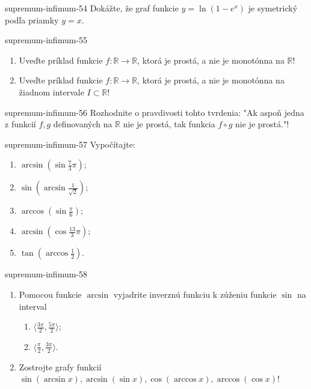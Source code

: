 \begin{defproblem}{supremum-infimum-54}
Dokážte, že graf funkcie $y=\ln (1-e^x)$ je symetrický podľa priamky $y=x$.
\end{defproblem}

\begin{defproblem}{supremum-infimum-55}
\begin{enumerate}
\item Uveďte príklad funkcie $f:\mathbb{R}\rightarrow\mathbb{R}$, ktorá je prostá, a nie je monotónna na $\mathbb{R}$!
\item Uveďte príklad funkcie $f:\mathbb{R}\rightarrow\mathbb{R}$, ktorá je prostá, a nie je monotónna na žiadnom intervale $I\subset\mathbb{R}$!
\end{enumerate}
\end{defproblem}

\begin{defproblem}{supremum-infimum-56}
Rozhodnite o pravdivosti tohto tvrdenia: "Ak aspoň jedna z funkcií $f,g$ definovaných na $\mathbb{R}$ nie je prostá, tak funkcia $f\circ g$ nie je prostá."!
\end{defproblem}

\begin{defproblem}{supremum-infimum-57}
Vypočítajte:
\begin{multicols}{2}
\begin{enumerate}
    \item $\arcsin(\sin \frac{7}{3}\pi)$;
    \item $\sin(\arcsin \frac{1}{\sqrt{2}})$;
    \item $\arccos(\sin \frac{\pi}{6})$;
    \item $\arcsin(\cos \frac{13}{3}\pi)$;
    \item $\tan(\arccos\frac{1}{2})$.
\end{enumerate}
\end{multicols}
\end{defproblem}

\begin{defproblem}{supremum-infimum-58}
\begin{enumerate}
\item Pomocou funkcie $\arcsin$ vyjadrite inverznú funkciu k zúženiu funkcie $\sin$ na interval
\begin{enumerate}
\item $\langle\frac{3\pi}{2},\frac{5\pi}{2}\rangle$;
\item $\langle\frac{\pi}{2},\frac{3\pi}{2}\rangle$.
\end{enumerate}
\item Zostrojte grafy funkcií $\sin(\arcsin x),\arcsin(\sin x),\cos(\arccos x),\arccos(\cos x)$!
\end{enumerate}
\end{defproblem}

